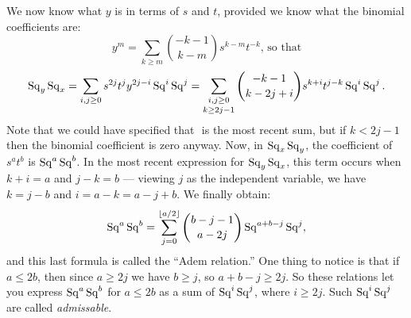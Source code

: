We now know what $y$ is in terms of $s$ and $t$, provided we know what the binomial coefficients are:
\[
y^m = \sum_{k \ge m} \binom{-k-1}{k-m} s^{k-m} t^{-k}\text{, \ so that}
\]
\[
\operatorname{Sq}_y \operatorname{Sq}_x = \sum_{i, j \ge 0} s^{2j} t^j y^{2j-i} \operatorname{Sq}^i \operatorname{Sq}^j = \mathop{\sum_{i, j \ge 0}}_{k\geq2j-1} \binom{-k-1}{k-2j+i} s^{k+i}t^{j-k}\operatorname{Sq}^i\operatorname{Sq}^j
.\]
Note that we could have specified that $ $ is the most recent sum, but if $k<2j-1$ then the binomial coefficient is zero anyway.
Now, in $\operatorname{Sq}_x \operatorname{Sq}_y$, the coefficient of $s^a t^b$ is $\operatorname{Sq}^a \operatorname{Sq}^b$.  In the most recent expression for $\operatorname{Sq}_y \operatorname{Sq}_x$, this term occurs when $k + i = a$ and $j - k = b$ --- viewing $j$ as the independent variable, we have $k = j - b$ and $i = a - k = a - j + b$.  We finally obtain:
\[
\operatorname{Sq}^a \operatorname{Sq}^b = \sum_{j=0}^{\lfloor a/2\rfloor} \binom{b-j-1}{a-2j} \operatorname{Sq}^{a+b-j} \operatorname{Sq}^j
,\]
and this last formula is called the ``Adem relation.''  One thing to notice is that if $a \le 2b$, then since $a \ge 2j$ we have $b \ge j$, so $a + b -j \ge 2j$.  So these relations let you express $\operatorname{Sq}^a \operatorname{Sq}^b$ for $a \le 2b$ as a sum of $\operatorname{Sq}^i \operatorname{Sq}^j$, where $i \ge 2j$.  Such $\operatorname{Sq}^i \operatorname{Sq}^j$ are called \emph{admissable}.

